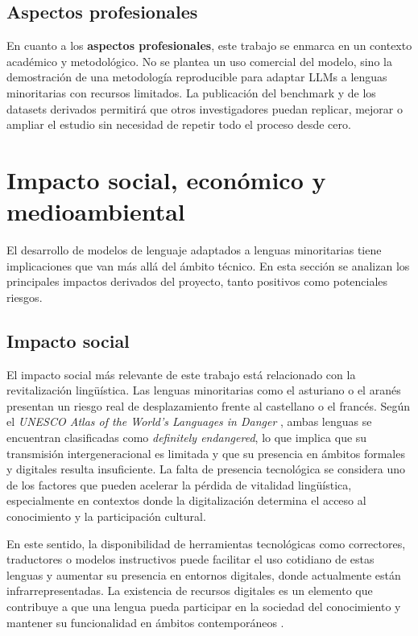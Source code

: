 \subsection{Aspectos profesionales}

En cuanto a los \textbf{aspectos profesionales}, este trabajo se enmarca en un contexto académico y metodológico. No se plantea un uso comercial del modelo, sino la demostración de una metodología reproducible para adaptar LLMs a lenguas minoritarias con recursos limitados. La publicación del benchmark y de los datasets derivados permitirá que otros investigadores puedan replicar, mejorar o ampliar el estudio sin necesidad de repetir todo el proceso desde cero.

\section{Impacto social, económico y medioambiental}

El desarrollo de modelos de lenguaje adaptados a lenguas minoritarias tiene implicaciones que van más allá del ámbito técnico. En esta sección se analizan los principales impactos derivados del proyecto, tanto positivos como potenciales riesgos.

\subsection{Impacto social}

El impacto social más relevante de este trabajo está relacionado con la revitalización lingüística. Las lenguas minoritarias como el asturiano o el aranés presentan un riesgo real de desplazamiento frente al castellano o el francés. Según el \textit{UNESCO Atlas of the World's Languages in Danger} \cite{unesco_atlas_2010}, ambas lenguas se encuentran clasificadas como \textit{definitely endangered}, lo que implica que su transmisión intergeneracional es limitada y que su presencia en ámbitos formales y digitales resulta insuficiente. La falta de presencia tecnológica se considera uno de los factores que pueden acelerar la pérdida de vitalidad lingüística, especialmente en contextos donde la digitalización determina el acceso al conocimiento y la participación cultural.

En este sentido, la disponibilidad de herramientas tecnológicas como correctores, traductores o modelos instructivos puede facilitar el uso cotidiano de estas lenguas y aumentar su presencia en entornos digitales, donde actualmente están infrarrepresentadas. La existencia de recursos digitales es un elemento que contribuye a que una lengua pueda participar en la sociedad del conocimiento y mantener su funcionalidad en ámbitos contemporáneos \cite{unesco_diversity_2003}.

